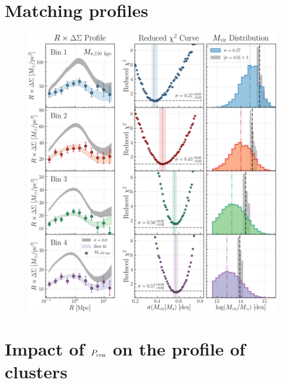 \documentclass[a4paper,fleqn,usenatbib]{mnras}
\begin{document}
\section{Matching \dsigma{} profiles} 
	\label{app:fitting} 
    

  \begin{figure}
      \centering 
      \includegraphics[width=\textwidth]{figure/topn_dsigma_m150_fit}
      \caption{
          }
      \label{fig:fitting}
  \end{figure}
    

\section{Impact of $P_{\rm cen}$ on the \dsigma{} profile of \redm{} clusters} 
	\label{app:pcen} 
    
\end{document}
